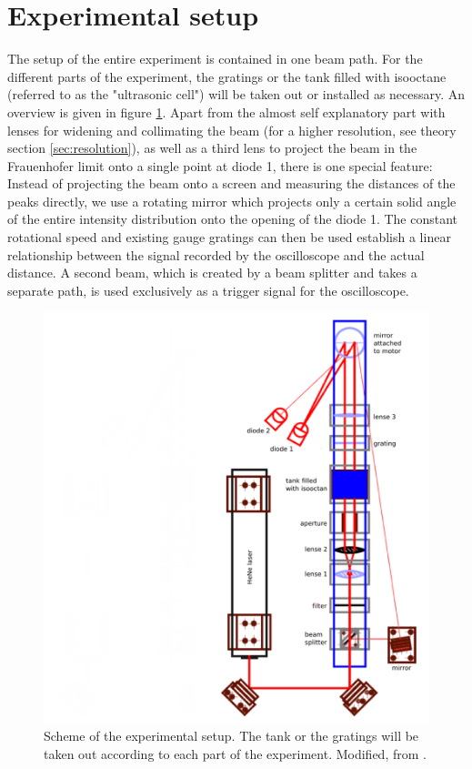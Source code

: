 \section{Experimental setup}
The setup of the entire experiment is contained in one beam path. 
For the different parts of the experiment, the gratings or the tank 
filled with isooctane (referred to as the "ultrasonic cell") will be 
taken out or installed as necessary. An overview is given in figure \ref{fig:setup}.
Apart from the almost self explanatory part with lenses for widening and 
collimating the beam (for a higher resolution, see theory section \ref{sec:resolution}), 
as well as a third lens to project the beam in the Frauenhofer limit 
onto a single point at diode 1, 
there is one special feature: Instead of projecting the beam onto a screen and 
measuring the distances of the peaks directly, we use a rotating mirror which 
projects only a certain solid angle of the entire intensity distribution onto 
the opening of the diode 1. The constant rotational speed and existing gauge gratings 
can then be used establish a linear relationship between the signal recorded by the 
oscilloscope and the actual distance. A second beam, which is created by a beam splitter and 
takes a separate path, is used exclusively as a trigger signal for the oscilloscope.

\begin{figure}
    \centering
    \includegraphics[width=1.0\textwidth]{figures/setup_bitmap.png}
    \caption{
        Scheme of the experimental setup. The tank or the gratings will be taken out 
        according to each part of the experiment.
        Modified, from \cite{ver}.
        }
    \label{fig:setup}
\end{figure}

